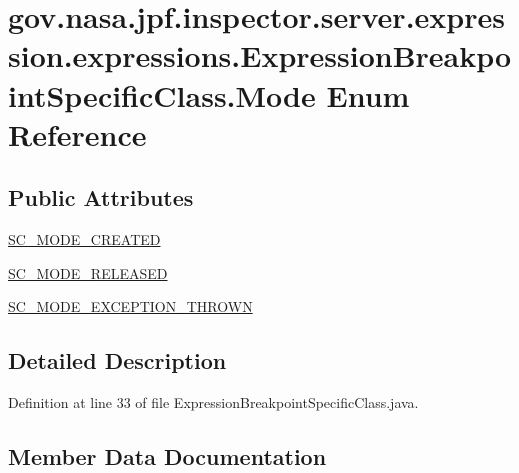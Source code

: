 \hypertarget{enumgov_1_1nasa_1_1jpf_1_1inspector_1_1server_1_1expression_1_1expressions_1_1_expression_breakpoint_specific_class_1_1_mode}{}\section{gov.\+nasa.\+jpf.\+inspector.\+server.\+expression.\+expressions.\+Expression\+Breakpoint\+Specific\+Class.\+Mode Enum Reference}
\label{enumgov_1_1nasa_1_1jpf_1_1inspector_1_1server_1_1expression_1_1expressions_1_1_expression_breakpoint_specific_class_1_1_mode}
\subsection*{Public Attributes}
\begin{DoxyCompactItemize}
\item 
\hyperlink{enumgov_1_1nasa_1_1jpf_1_1inspector_1_1server_1_1expression_1_1expressions_1_1_expression_breakpoint_specific_class_1_1_mode_aa278f9b697725f808bd94318e272ca03}{S\+C\+\_\+\+M\+O\+D\+E\+\_\+\+C\+R\+E\+A\+T\+ED}
\item 
\hyperlink{enumgov_1_1nasa_1_1jpf_1_1inspector_1_1server_1_1expression_1_1expressions_1_1_expression_breakpoint_specific_class_1_1_mode_a0c7115882769cddd4468e56c3d612ad2}{S\+C\+\_\+\+M\+O\+D\+E\+\_\+\+R\+E\+L\+E\+A\+S\+ED}
\item 
\hyperlink{enumgov_1_1nasa_1_1jpf_1_1inspector_1_1server_1_1expression_1_1expressions_1_1_expression_breakpoint_specific_class_1_1_mode_a179a576b4173f087ba53a0691523b163}{S\+C\+\_\+\+M\+O\+D\+E\+\_\+\+E\+X\+C\+E\+P\+T\+I\+O\+N\+\_\+\+T\+H\+R\+O\+WN}
\end{DoxyCompactItemize}


\subsection{Detailed Description}


Definition at line 33 of file Expression\+Breakpoint\+Specific\+Class.\+java.



\subsection{Member Data Documentation}
